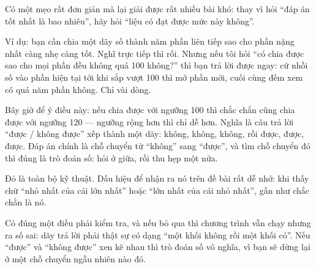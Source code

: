 \documentclass[../../algorithm.tex]{subfiles}
\begin{document}
\begin{dongian}
Có một mẹo rất đơn giản mà lại giải được rất nhiều bài khó: thay vì hỏi ``đáp án tốt nhất là bao nhiêu'', hãy hỏi ``liệu có đạt được mức này không''.

Ví dụ: bạn cần chia một dãy số thành năm phần liên tiếp sao cho phần nặng nhất càng nhẹ càng tốt. Nghĩ trực tiếp thì rối. Nhưng nếu tôi hỏi ``có chia được sao cho mọi phần đều không quá 100 không?'' thì bạn trả lời được ngay: cứ nhồi số vào phần hiện tại tới khi sắp vượt 100 thì mở phần mới, cuối cùng đếm xem có quá năm phần không. Chỉ vài dòng.

Bây giờ để ý điều này: nếu chia được với ngưỡng 100 thì chắc chắn cũng chia được với ngưỡng 120 --- ngưỡng rộng hơn thì chỉ dễ hơn. Nghĩa là câu trả lời ``được / không được'' xếp thành một dãy: không, không, không, rồi được, được, được. Đáp án chính là chỗ chuyển từ ``không'' sang ``được'', và tìm chỗ chuyển đó thì đúng là trò đoán số: hỏi ở giữa, rồi thu hẹp một nửa.

Đó là toàn bộ kỹ thuật. Dấu hiệu để nhận ra nó trên đề bài rất dễ nhớ: khi thấy chữ ``nhỏ nhất của cái lớn nhất'' hoặc ``lớn nhất của cái nhỏ nhất'', gần như chắc chắn là nó.

Có đúng một điều phải kiểm tra, và nếu bỏ qua thì chương trình vẫn chạy nhưng ra số sai: dãy trả lời phải thật sự có dạng ``một khối không rồi một khối có''. Nếu ``được'' và ``không được'' xen kẽ nhau thì trò đoán số vô nghĩa, vì bạn sẽ dừng lại ở một chỗ chuyển ngẫu nhiên nào đó.
\end{dongian}
\end{document}
